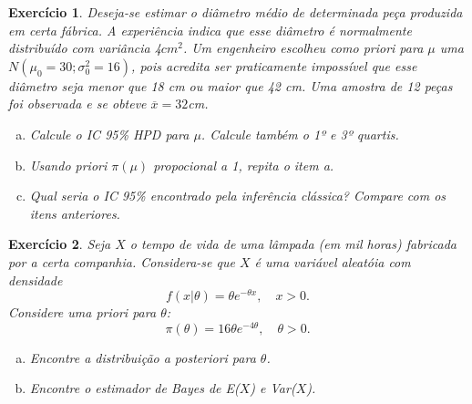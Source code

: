 \documentclass[letter,11pt]{article}
\newtheorem{exer}{Exercício}
\begin{document}
\begin{exer} \rm
Deseja-se estimar o diâmetro médio de determinada peça produzida em certa fábrica. A experiência indica que esse diâmetro é normalmente distribuído com variância 4$cm^2$.
Um engenheiro escolheu como priori para $\mu$ uma $N(\mu_0 = 30; \sigma_0^2=16)$, pois acredita ser praticamente impossível que esse diâmetro seja menor que 18 cm ou maior que 42 cm. Uma amostra de 12 peças foi observada e se obteve $\overline{x}=32$cm.

\begin{enumerate}[a)]
  \item Calcule o IC 95\% HPD para $\mu$. Calcule também o 1º e 3º quartis.
  \item Usando priori $\pi(\mu)$ propocional a 1, repita o item a.
  \item Qual seria o IC 95\% encontrado pela inferência clássica? Compare com os itens anteriores.
\end{enumerate}
\end{exer}


\begin{exer} \rm
Seja $X$ o tempo de vida de uma lâmpada (em mil horas) fabricada por a certa companhia. Considera-se que $X$ é  uma variável aleatóia com densidade
\[f(x|\theta)=\theta e^{-\theta x},\quad x>0.\]
Considere uma priori para $\theta$: 
\[\pi(\theta)=16\theta e^{-4\theta},\quad \theta>0.\]

\begin{enumerate}[a)]
    \item Encontre a distribuição a posteriori para $\theta$.
    \item Encontre o estimador de Bayes de E($X$) e Var($X$). 
\end{enumerate}
\end{exer}
\end{document}
